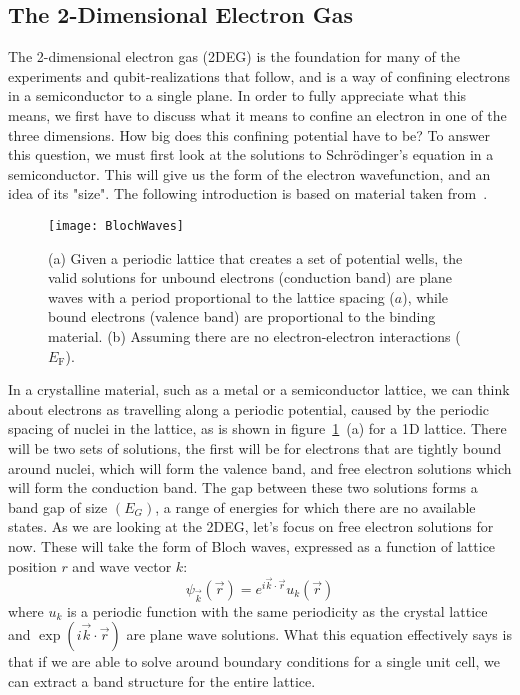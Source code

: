\subsection{The 2-Dimensional Electron Gas}
The 2-dimensional electron gas (2DEG) is the foundation for many of the experiments and qubit-realizations
that follow, and is a way of confining electrons in a semiconductor to a single plane. In order to fully
appreciate what this means, we first have to discuss what it means to confine an electron in one of the three dimensions.
How big does this confining potential have to be? To answer this question, we must first look at the solutions
to Schr\"odinger's equation in a semiconductor. This will give us the form of the electron wavefunction, and
an idea of its "size". The following introduction is based on material taken from~\cite{delftbook,ihnbook,Ashcroft}.

\begin{figure}
  \texttt{[image: BlochWaves]}
  \caption[Bloch Waves on a regular lattice]
  {(a) Given a periodic lattice that creates a set of potential wells, the valid solutions for unbound
   electrons (conduction band) are plane waves with a period proportional to the lattice spacing ($a$),
   while bound electrons (valence band) are proportional to the binding material. (b) Assuming there are no
   electron-electron interactions ($E_\textrm{F}$).}
  \label{fig:blochwaves}
\end{figure}

In a crystalline material, such as a metal or a semiconductor lattice, we can think
about electrons as travelling along a periodic potential, caused by the periodic spacing of nuclei in the lattice, as
is shown in figure~\ref{fig:blochwaves}~(a) for a 1D lattice. There will be two sets of solutions, the first will be for electrons
that are tightly bound around nuclei, which will form the valence band, and free electron solutions which
will form the conduction band. The gap between these two solutions forms a band gap of size $(E_G)$, a range
of energies for which there are no available states. As we are looking at the 2DEG, let's focus on free electron solutions for now.
These will take the form of Bloch waves, expressed as a function of lattice position $r$ and wave vector $k$:
\begin{equation}
  \psi_{\vec{k}}(\vec{r}) = e^{i\vec{k} \cdot \vec{r}}u_k(\vec{r})
\end{equation}
where $u_k$ is a periodic function with the same periodicity as the crystal lattice and $\exp\left(i\vec{k} \cdot \vec{r}\right)$ are
plane wave solutions. What this equation effectively says is that if we are able to solve around boundary conditions for
a single unit cell, we can extract a band structure for the entire lattice.

